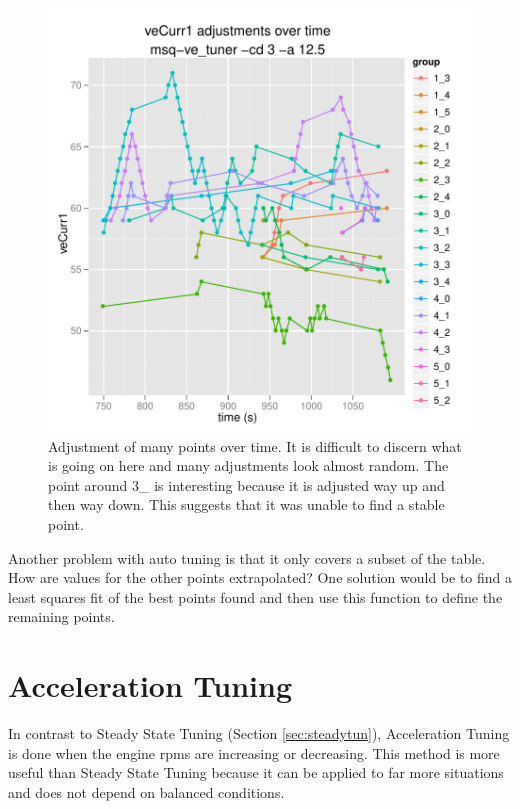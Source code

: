 \documentclass{article}
\begin{document}
\begin{figure}
\center
\includegraphics[scale=0.7]{analyze/cve/cve-many_points-cd3.pdf}
\caption{Adjustment of many points over time.
It is difficult to discern what is going on here and many
adjustments look almost random.  The point around 3\_ is interesting
because it is adjusted way up and then way down.
This suggests that it was unable to find a stable point.}
\label{fig:cve02}
\end{figure}

Another problem with auto tuning is that it only covers a subset
of the table.
How are values for the other points extrapolated?
One solution would be to find a least squares fit of the best points
found and then use this function to define the remaining points.

\section{Acceleration Tuning}
\label{sec:acctun}

In contrast to Steady State Tuning (Section \ref{sec:steadytun}), Acceleration
Tuning is done when the engine rpms are increasing or decreasing.
This method is more useful than Steady State Tuning because it can be
applied to far more situations and does not depend on balanced conditions.
\end{document}
